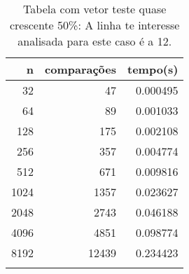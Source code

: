 \begin{table}[ht]
\centering
\begin{tabular}{rrr} \toprule
        n &    comparações &       tempo(s) \\ \midrule
      32  &             47 &      0.000495 \\
      64  &             89 &      0.001033 \\
     128  &            175 &      0.002108 \\
     256  &            357 &      0.004774 \\
     512  &            671 &      0.009816 \\
    1024  &           1357 &      0.023627 \\
    2048  &           2743 &      0.046188 \\
    4096  &           4851 &      0.098774 \\
    8192  &          12439 &      0.234423 \\
\bottomrule\addlinespace
\end{tabular}
\caption{Tabela com vetor teste quase crescente 50\%: A linha te interesse analisada para este caso é a 12.}
\label{tab:quicksortQuaseCresc50}
\end{table}
